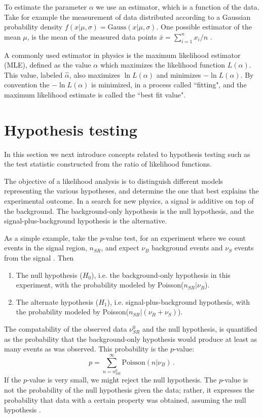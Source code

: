 To estimate the parameter $\alpha$ we use an estimator, which is a function of the data. Take for example the measurement of data distributed according to a Gaussian probability density $f(x| \mu,\sigma) = \text{Gauss}(x|\mu,\sigma)$. One possible estimator of the mean $\mu$, is the mean of the measured data points $\bar{x} = \sum_{i = 1}^{n} x_i / n$ \cite{2011-Statistics-Cranmer}. 

A commonly used estimator in physics is the maximum likelihood estimator (MLE), defined as the value $\alpha$ which maximizes the likelihood function $L(\alpha)$. This value, labeled $\hat{\alpha}$, also maximizes $\ln L(\alpha)$ and minimizes $-\ln L(\alpha)$. By convention the $-\ln L(\alpha)$ is minimized, in a process called ``fitting", and the maximum likelihood estimate is called the ``best fit value". 





\section{Hypothesis testing}
In this section we next introduce concepts related to hypothesis testing such as the test statistic constructed from the ratio of likelihood functions.

The objective of a likelihood analysis is to distinguish different models representing the various hypotheses, and determine the one that best explains the experimental outcome. In a search for new physics, a signal is additive on top of the background. The background-only hypothesis is the null hypothesis, and the signal-plus-background hypothesis is the alternative. 

As a simple example, take the $p$-value test, for an experiment where we count events in the signal region, $n_{SR}$, and expect $\nu_B$ background events and $\nu_S$ events from the signal \cite{2011-Statistics-Cranmer}. Then 
\begin{enumerate}
    \item The null hypothesis ($H_0$), i.e. the background-only hypothesis in this experiment, with the probability modeled by Poisson($n_{SR}|\nu_B$).
    \item The alternate hypothesis ($H_1$), i.e. signal-plus-background hypothesis, with the probability modeled by Poisson($n_{SR}|(\nu_B + \nu_S)$).
\end{enumerate}
The compatability of the observed data $\nu^0_{SR}$ and the null hypothesis, is quantified as the probability that the background-only hypothesis would produce at least as many events as was observed. This probability is the $p$-value: 
\begin{equation}
    p = \sum_{n = n^0_{SR}}^{\infty} \text{Poisson}(n | \nu_B) \, .
\end{equation}
If the $p$-value is very small, we might reject the null hypothesis. The $p$-value is not the probability of the null hypothesis given the data; rather, it expresses the probability that data with a certain property was obtained, assuming the null hypothesis \cite{2011-Statistics-Cranmer}.

